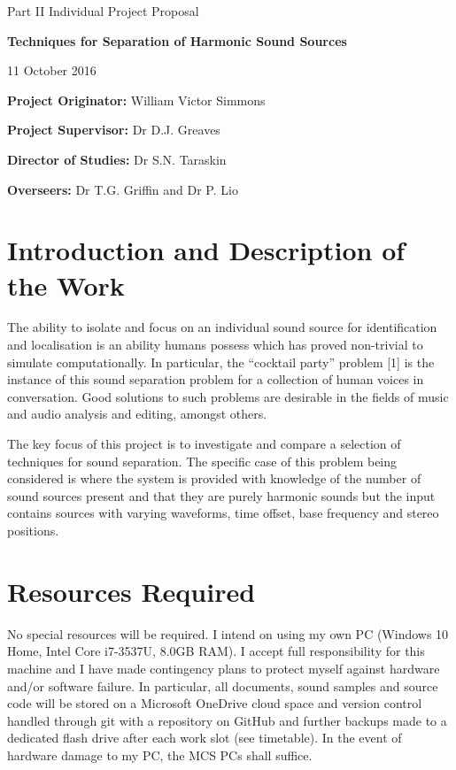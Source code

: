\documentclass[12pt]{article}
\begin{document}
\medskip
{}
\medskip
{}

\vspace{5mm}

\centerline{\large Part II Individual Project Proposal}
\vspace{5mm}
\centerline{\Large\bf Techniques for Separation of Harmonic Sound Sources}
\vspace{5mm}
\centerline{\large 11 October 2016}

{\bf Project Originator:} William Victor Simmons

{\bf Project Supervisor:} Dr D.J. Greaves

{\bf Director of Studies:} Dr S.N. Taraskin

{\bf Overseers:} Dr T.G. Griffin and Dr P. Lio

\section*{Introduction and Description of the Work}

The ability to isolate and focus on an individual sound source for identification and localisation is an ability humans possess which has proved non-trivial to simulate computationally. In particular, the ``cocktail party'' problem [1] is the instance of this sound separation problem for a collection of human voices in conversation. Good solutions to such problems are desirable in the fields of music and audio analysis and editing, amongst others.

The key focus of this project is to investigate and compare a selection of techniques for sound separation. The specific case of this problem being considered is where the system is provided with knowledge of the number of sound sources present and that they are purely harmonic sounds but the input contains sources with varying waveforms, time offset, base frequency and stereo positions.

\section*{Resources Required}

No special resources will be required. I intend on using my own PC (Windows 10 Home, Intel Core i7-3537U, 8.0GB RAM). I accept full responsibility for this machine and I have made contingency plans to protect myself against hardware and/or software failure. In particular, all documents, sound samples and source code will be stored on a Microsoft OneDrive cloud space and version control handled through git with a repository on GitHub and further backups made to a dedicated flash drive after each work slot (see timetable). In the event of hardware damage to my PC, the MCS PCs shall suffice.
\end{document}
